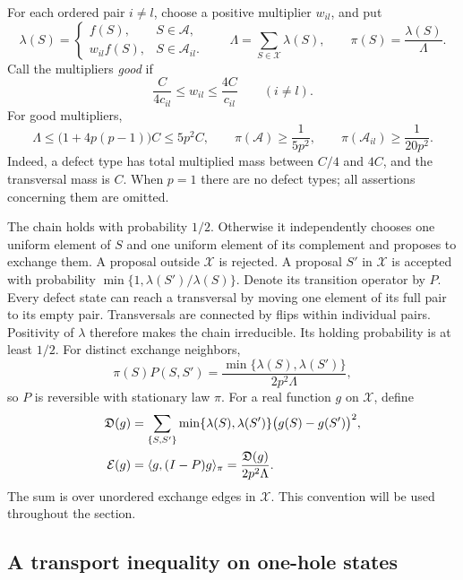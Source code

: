 For each ordered pair $i\ne l$, choose a positive multiplier $w_{il}$,
and put
\[
 \lambda(S)=
 \begin{cases}
   f(S),&S\in\mathcal A,\\
   w_{il}f(S),&S\in\mathcal A_{il}.
 \end{cases}
 \qquad
 \Lambda=\sum_{S\in\mathcal X}\lambda(S),
 \qquad
 \pi(S)=\frac{\lambda(S)}{\Lambda}.
\]
Call the multipliers \emph{good} if
\begin{equation}
 \frac{C}{4c_{il}}\leq w_{il}\leq\frac{4C}{c_{il}}
 \qquad(i\ne l).
 \label{eq:good-multipliers}
\end{equation}
For good multipliers,
\begin{equation}
 \Lambda\leq \bigl(1+4p(p-1)\bigr)C\leq 5p^2C,
 \qquad
 \pi(\mathcal A)\geq\frac{1}{5p^2},
 \qquad
 \pi(\mathcal A_{il})\geq\frac{1}{20p^2}.
 \label{eq:type-mass-bounds}
\end{equation}
Indeed, a defect type has total multiplied mass between $C/4$ and
$4C$, and the transversal mass is $C$. When $p=1$ there are no defect
types; all assertions concerning them are omitted.

The chain holds with probability $1/2$. Otherwise it independently
chooses one uniform element of $S$ and one uniform element of its
complement and proposes to exchange them. A proposal outside
$\mathcal X$ is rejected. A proposal $S'$ in $\mathcal X$ is accepted
with probability
$\min\{1,\lambda(S')/\lambda(S)\}$.
Denote its transition operator by $P$.
Every defect state can reach a transversal by moving one element of
its full pair to its empty pair. Transversals are connected by flips
within individual pairs. Positivity of $\lambda$ therefore makes the
chain irreducible. Its holding probability is at least $1/2$.
For distinct exchange neighbors,
\[
 \pi(S)P(S,S')=
 \frac{\min\{\lambda(S),\lambda(S')\}}{2p^2\Lambda},
\]
so $P$ is reversible with stationary law $\pi$.
For a real function $g$ on $\mathcal X$, define
\begin{align}
 \mathfrak D(g)
   &=\sum_{\{S,S'\}}
       \min\{\lambda(S),\lambda(S')\}
          \bigl(g(S)-g(S')\bigr)^2,
 \notag\\
 \mathcal E(g)
   &=\langle g,(I-P)g\rangle_\pi
     =\frac{\mathfrak D(g)}{2p^2\Lambda}.
 \label{eq:energy}
\end{align}
The sum is over unordered exchange edges in $\mathcal X$.
This convention will be used throughout the section.

\subsection{A transport inequality on one-hole states}

